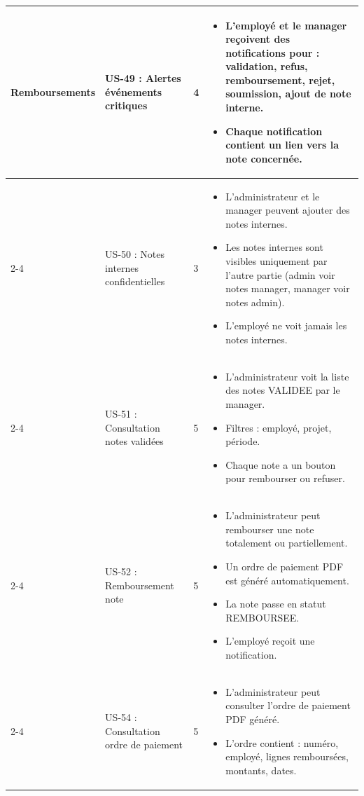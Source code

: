 \documentclass[12pt,a4paper]{report}
\begin{document}
\begin{longtable}{|p{2.5cm}|p{3cm}|p{1.5cm}|p{8cm}|}
\multirow{10}{*}{Remboursements} & US-49 : Alertes événements critiques & 4 & \begin{itemize}
 \item L’employé et le manager reçoivent des notifications pour : validation, refus, remboursement, rejet, soumission, ajout de note interne.
 \item Chaque notification contient un lien vers la note concernée.
\end{itemize} \\
\cline{2-4}
& US-50 : Notes internes confidentielles & 3 & \begin{itemize}
 \item L’administrateur et le manager peuvent ajouter des notes internes.
 \item Les notes internes sont visibles uniquement par l’autre partie (admin voir notes manager, manager voir notes admin).
 \item L’employé ne voit jamais les notes internes.
\end{itemize} \\
\cline{2-4}
& US-51 : Consultation notes validées & 5 & \begin{itemize}
 \item L’administrateur voit la liste des notes VALIDEE par le manager.
 \item Filtres : employé, projet, période.
 \item Chaque note a un bouton pour rembourser ou refuser.
\end{itemize} \\
\cline{2-4}
& US-52 : Remboursement note & 5 & \begin{itemize}
 \item L’administrateur peut rembourser une note totalement ou partiellement.
 \item Un ordre de paiement PDF est généré automatiquement.
 \item La note passe en statut REMBOURSEE.
 \item L’employé reçoit une notification.
\end{itemize} \\
\cline{2-4}
& US-54 : Consultation ordre de paiement & 5 & \begin{itemize}
 \item L’administrateur peut consulter l’ordre de paiement PDF généré.
 \item L’ordre contient : numéro, employé, lignes remboursées, montants, dates.
\end{itemize} \\

\end{longtable}
\end{document}
